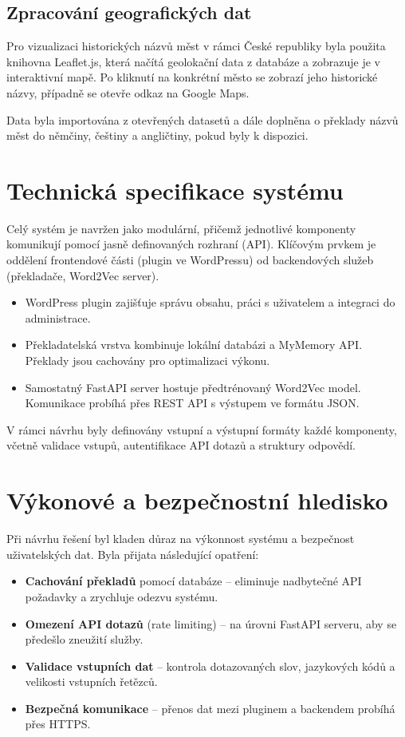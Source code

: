 \documentclass[czech, ba, kiv, he]{fasthesis}
\begin{document}
\subsection{Zpracování geografických dat}

Pro vizualizaci historických názvů měst v rámci České republiky byla použita knihovna Leaflet.js, která načítá geolokační data z databáze a zobrazuje je v interaktivní mapě. Po kliknutí na konkrétní město se zobrazí jeho historické názvy, případně se otevře odkaz na Google Maps.

Data byla importována z otevřených datasetů a dále doplněna o překlady názvů měst do němčiny, češtiny a angličtiny, pokud byly k dispozici.

\section{Technická specifikace systému}

Celý systém je navržen jako modulární, přičemž jednotlivé komponenty komunikují pomocí jasně definovaných rozhraní (API). Klíčovým prvkem je oddělení frontendové části (plugin ve WordPressu) od backendových služeb (překladače, Word2Vec server).

\begin{itemize}
    \item WordPress plugin zajišťuje správu obsahu, práci s uživatelem a integraci do administrace.
    \item Překladatelská vrstva kombinuje lokální databázi a MyMemory API. Překlady jsou cachovány pro optimalizaci výkonu.
    \item Samostatný FastAPI server hostuje předtrénovaný Word2Vec model. Komunikace probíhá přes REST API s výstupem ve formátu JSON.
\end{itemize}

V rámci návrhu byly definovány vstupní a výstupní formáty každé komponenty, včetně validace vstupů, autentifikace API dotazů a struktury odpovědí.

\section{Výkonové a bezpečnostní hledisko}

Při návrhu řešení byl kladen důraz na výkonnost systému a bezpečnost uživatelských dat. Byla přijata následující opatření:

\begin{itemize}
    \item \textbf{Cachování překladů} pomocí databáze – eliminuje nadbytečné API požadavky a zrychluje odezvu systému.
    \item \textbf{Omezení API dotazů} (rate limiting) – na úrovni FastAPI serveru, aby se předešlo zneužití služby.
    \item \textbf{Validace vstupních dat} – kontrola dotazovaných slov, jazykových kódů a velikosti vstupních řetězců.
    \item \textbf{Bezpečná komunikace} – přenos dat mezi pluginem a backendem probíhá přes HTTPS.
\end{itemize}
\end{document}
